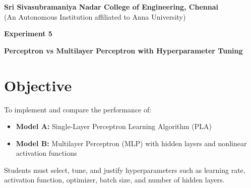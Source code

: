 \documentclass[11pt]{article}
\begin{document}
\begin{center}
    \Large \textbf{Sri Sivasubramaniya Nadar College of Engineering, Chennai} \\
    \large (An Autonomous Institution affiliated to Anna University) \\
    \vspace{0.3cm}
\end{center}

\begin{table}[h!]
\renewcommand{\arraystretch}{1.5}
\centering
{}
\end{table}

\begin{center}
    \textbf{\Large Experiment 5}
\end{center}

\begin{center}
    \textbf{Perceptron vs Multilayer Perceptron with Hyperparameter Tuning}
\end{center}

\section*{Objective}
To implement and compare the performance of:
\begin{itemize}
    \item \textbf{Model A:} Single-Layer Perceptron Learning Algorithm (PLA)
    \item \textbf{Model B:} Multilayer Perceptron (MLP) with hidden layers and nonlinear activation functions
\end{itemize}

Students must select, tune, and justify hyperparameters such as learning rate, activation function, optimizer, batch size, and number of hidden layers.
\end{document}
